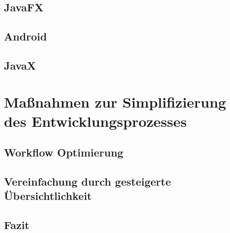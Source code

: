 \subsection{JavaFX}
\label{aktuelle_verwendung_von_annotationen_javafx}


\subsection{Android}
\label{aktuelle_verwendung_von_annotationen_android}


\subsection{JavaX}
\label{aktuelle_verwendung_von_annotationen_javax}


\section{Maßnahmen zur Simplifizierung des Entwicklungsprozesses}
\label{maßnahmen_zur_simplifizierung_des_entwicklungsprozesses}


\subsection{Workflow Optimierung}
\label{maßnahmen_zur_simplifizierung_des_entwicklungsprozesses_workflow}


\subsection{Vereinfachung durch gesteigerte Übersichtlichkeit}
\label{maßnahmen_zur_simplifizierung_des_entwicklungsprozesses_übersichtichkeit}


\subsection{Fazit}
\label{maßnahmen_zur_simplifizierung_des_entwicklungsprozesses_fazit}

